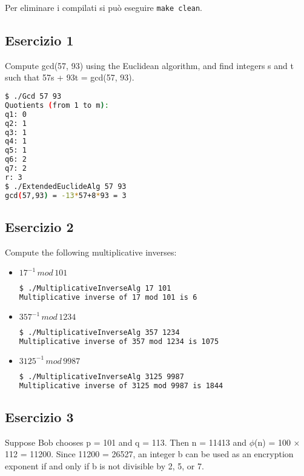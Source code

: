 \documentclass{article}
\begin{document}
Per eliminare i compilati si pu\`{o} eseguire \lstinline{make clean}.
\subsection{Esercizio 1}
Compute gcd(57, 93) using the Euclidean algorithm, and find integers s and t such that 57s + 93t = gcd(57, 93).

\begin{lstlisting}[language=bash]
$ ./Gcd 57 93
Quotients (from 1 to m):
q1: 0
q2: 1
q3: 1
q4: 1
q5: 1
q6: 2
q7: 2
r: 3
$ ./ExtendedEuclideAlg 57 93
gcd(57,93) = -13*57+8*93 = 3
\end{lstlisting}

\subsection{Esercizio 2}
Compute the following multiplicative inverses: 
\begin{itemize}
    \item \(17^{-1} \, mod \, 101\)
    \begin{lstlisting}[language=bash]
$ ./MultiplicativeInverseAlg 17 101
Multiplicative inverse of 17 mod 101 is 6
    \end{lstlisting}                       

    \item \(357^{-1} \, mod \, 1234\)
    \begin{lstlisting}[language=bash]
$ ./MultiplicativeInverseAlg 357 1234
Multiplicative inverse of 357 mod 1234 is 1075
    \end{lstlisting}
    \item \(3125^{-1} \, mod \, 9987\)
    \begin{lstlisting}[language=bash]
$ ./MultiplicativeInverseAlg 3125 9987
Multiplicative inverse of 3125 mod 9987 is 1844
    \end{lstlisting}
\end{itemize}

\subsection{Esercizio 3}
Suppose Bob chooses p = 101 and q = 113. Then n = 11413 and \(\phi\)(n) = 100 × 112 = 11200. Since 11200 = 26527, an integer b can be used as an encryption exponent if and only if b is not divisible by 2, 5, or 7.
\end{document}
